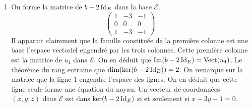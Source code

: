 \begin{enumerate}
\item On forme la matrice de $b-2\operatorname{Id}_E$ dans la base $\mathcal{E}$.
\begin{displaymath}
\begin{pmatrix}
1 & -3 & -1 \\ 0 & 0 & 0 \\ 1 & -3 & -1
\end{pmatrix}
\end{displaymath}
Il apparait clairement que la famille constituée de la première colonne est une base l'espace vectoriel engendré par les trois colonnes. Cette première colonne est la matrice de $u_4$ dans $\mathcal{E}$. On en déduit que $\operatorname{Im}(b-2\operatorname{Id}_E)=\operatorname{Vect}(u_4)$. Le théorème du rang entraine que $\dim(\ker(b-2\operatorname{Id}_E))=2$.\newline
On remarque sur la matrice que la ligne 1 engendre l'espace des lignes. On en déduit que cette ligne seule forme une équation du noyau. Un vecteur de coordonnées $(x,y,z)$ dans $\mathcal{E}$ est dans $\ker(b-2\operatorname{Id}_E)$ si et seulement si $x-3y-1=0$.


\end{enumerate}
